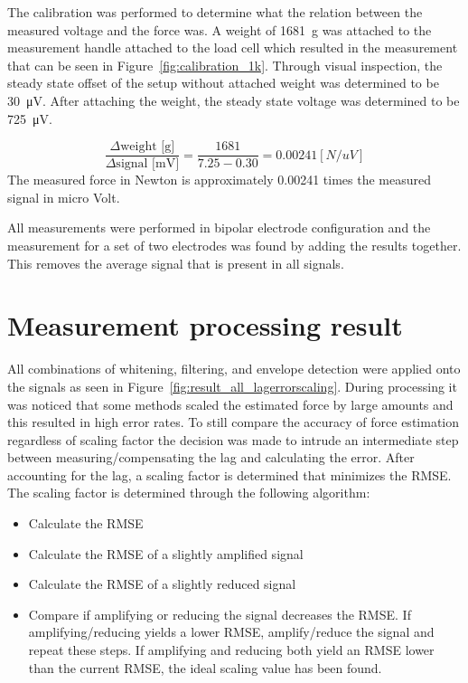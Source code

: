 The calibration was performed to determine what the relation between the measured voltage and the force was. A weight of \SI{1681}{\gram} was attached to the measurement handle attached to the load cell which resulted in the measurement that can be seen in Figure~\ref{fig:calibration_1k}. Through visual inspection, the steady state offset of the setup without attached weight was determined to be \SI{30}{\micro\volt}. After attaching the weight, the steady state voltage was determined to be \SI{725}{\micro\volt}.

\begin{equation}
    \frac{\Delta \text{weight [g]}}{\Delta \text{signal [mV]}} = \frac{1681}{7.25-0.30} = 0.00241 [N/uV]
\end{equation}
The measured force in Newton is approximately 0.00241 times the measured signal in micro Volt.

All measurements were performed in bipolar electrode configuration and the measurement for a set of two electrodes was found by adding the results together. This removes the average signal that is present in all signals.

\section{Measurement processing result}
All combinations of whitening, filtering, and envelope detection were applied onto the signals as seen in Figure~\ref{fig:result_all_lagerrorscaling}. 
During processing it was noticed that some methods scaled the estimated force by large amounts and this resulted in high error rates. To still compare the accuracy of force estimation regardless of scaling factor the decision was made to intrude an intermediate step between measuring/compensating the lag and calculating the error. After accounting for the lag, a scaling factor is determined that minimizes the RMSE. The scaling factor is determined through the following algorithm:
\begin{itemize}
    \item Calculate the RMSE
    \item Calculate the RMSE of a slightly amplified signal
    \item Calculate the RMSE of a slightly reduced signal
    \item Compare if amplifying or reducing the signal decreases the RMSE. If amplifying/reducing yields a lower RMSE, amplify/reduce the signal and repeat these steps. If amplifying and reducing both yield an RMSE lower than the current RMSE, the ideal scaling value has been found.
\end{itemize}

